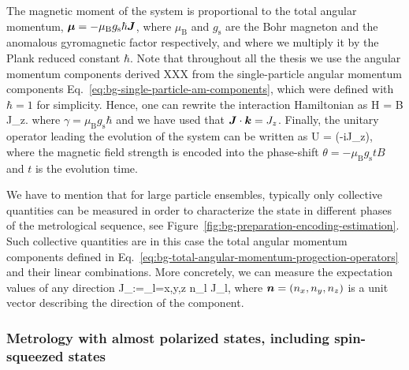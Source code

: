 The magnetic moment of the system is proportional to the total angular momentum, $\boldsymbol{\mu}=-\mu_\text{B} g_{\text{s}}\hbar \boldsymbol{J}$, where $\mu_{\text{B}}$ and $g_{\text{s}}$ are the Bohr magneton and the anomalous gyromagnetic factor respectively, and where we multiply it by the Plank reduced constant $\hbar$.
Note that throughout all the thesis we use the angular momentum components derived XXX from the single-particle angular momentum components Eq.~\eqref{eq:bg-single-particle-am-components}, which were defined with $\hbar{=}1$ for simplicity.
Hence, one can rewrite the interaction Hamiltonian as
\be
  \label{eq:bg-hamiltonian-homogeneous-field}
  H = \gamma B J_z.
\ee
where $\gamma = \mu_\text{B} g_{\text{s}}\hbar$ and we have used that $\boldsymbol{J}\cdot\boldsymbol{k}=J_z$.
Finally, the unitary operator leading the evolution of the system can be written as
\be
  \label{eq:bg-unitary-homogeneous-field}
  U = \exp(-i\theta J_z),
\ee
where the magnetic field strength is encoded into the phase-shift $\theta=-\mu_\text{B} g_\text{s} t B$ and $t$ is the evolution time.

We have to mention that for large particle ensembles, typically only collective quantities can be measured in order to characterize the state in different phases of the metrological sequence, see Figure~\ref{fig:bg-preparation-encoding-estimation}.
Such collective quantities are in this case the total angular momentum components defined in Eq.~\eqref{eq:bg-total-angular-momentum-progection-operators} and their linear combinations.
More concretely, we can measure the expectation values of any direction
\be
  \label{eq:bg-total-angular-momentum-projector-arbitrary-direction}
  J_{}:=\sum_{l=x,y,z} n_l J_l,
\ee
where $\boldsymbol{n}=(n_x,n_y,n_z)$ is a unit vector describing the direction of the component.

\subsubsection[Metrology with almost polarized states]{Metrology with almost polarized states, including spin-squeezed states}
\label{sec:bg-metrology-with-almost-polarized}


